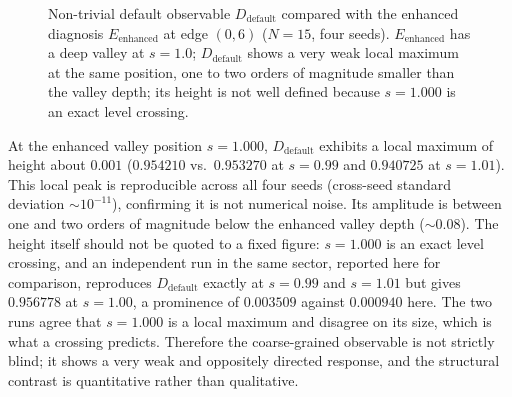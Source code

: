 \documentclass[aps,prb,reprint,superscriptaddress]{revtex4-2}
\begin{document}
\begin{figure}[t]
\centering
{}
\caption{Non-trivial default observable $D_{\text{default}}$ compared with the enhanced diagnosis $E_{\text{enhanced}}$ at edge $(0,6)$ ($N=15$, four seeds). $E_{\text{enhanced}}$ has a deep valley at $s=1.0$; $D_{\text{default}}$ shows a very weak local maximum at the same position, one to two orders of magnitude smaller than the valley depth; its height is not well defined because $s=1.000$ is an exact level crossing.}
\label{fig:default_control}
\end{figure}

At the enhanced valley position $s=1.000$, $D_{\text{default}}$ exhibits a local maximum of height about $0.001$ ($0.954210$ vs.\ $0.953270$ at $s=0.99$ and $0.940725$ at $s=1.01$). This local peak is reproducible across all four seeds (cross-seed standard deviation $\sim10^{-11}$), confirming it is not numerical noise. Its amplitude is between one and two orders of magnitude below the enhanced valley depth ($\sim0.08$). The height itself should not be quoted to a fixed figure: $s=1.000$ is an exact level crossing, and an independent run in the same sector, reported here for comparison, reproduces $D_{\text{default}}$ exactly at $s=0.99$ and $s=1.01$ but gives $0.956778$ at $s=1.00$, a prominence of $0.003509$ against $0.000940$ here. The two runs agree that $s=1.000$ is a local maximum and disagree on its size, which is what a crossing predicts. Therefore the coarse-grained observable is not strictly blind; it shows a very weak and oppositely directed response, and the structural contrast is quantitative rather than qualitative.
\end{document}
